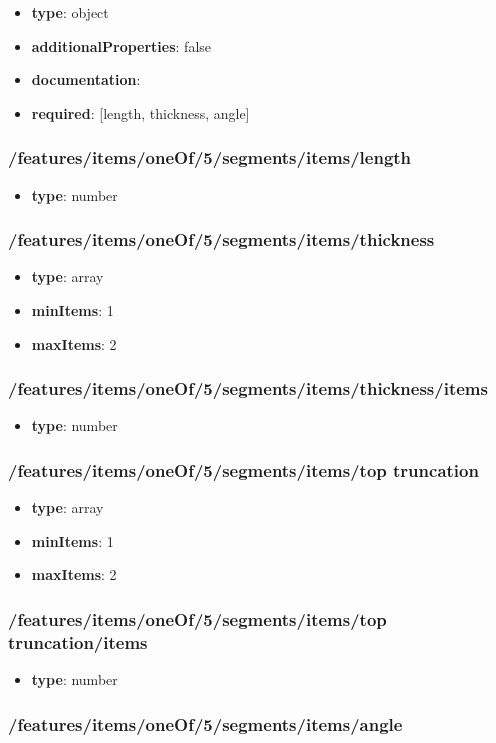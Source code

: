 \begin{itemize}\item {\bf type}: object
\item {\bf additionalProperties}: false
\item {\bf documentation}: 
\item {\bf required}: [length, thickness, angle]\end{itemize}
\subsubsection{/features/items/oneOf/5/segments/items/length}
\begin{itemize}\item {\bf type}: number
\end{itemize}\subsubsection{/features/items/oneOf/5/segments/items/thickness}
\begin{itemize}\item {\bf type}: array
\item {\bf minItems}: 1
\item {\bf maxItems}: 2
\end{itemize}\subsubsection{/features/items/oneOf/5/segments/items/thickness/items}
\begin{itemize}\item {\bf type}: number
\end{itemize}\subsubsection{/features/items/oneOf/5/segments/items/top truncation}
\begin{itemize}\item {\bf type}: array
\item {\bf minItems}: 1
\item {\bf maxItems}: 2
\end{itemize}\subsubsection{/features/items/oneOf/5/segments/items/top truncation/items}
\begin{itemize}\item {\bf type}: number
\end{itemize}\subsubsection{/features/items/oneOf/5/segments/items/angle}
